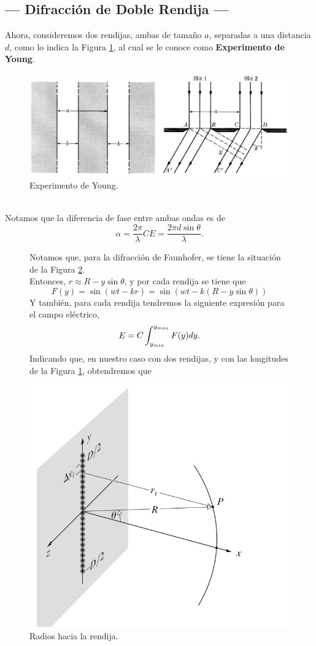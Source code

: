 \documentclass[12pt,a4paper]{article}
\begin{document}
\subsection{--- Difracción de Doble Rendija ---} %
\label{sub:difraccion_dos}
Ahora, consideremos dos rendijas, ambas de tamaño \(a\), separadas a una distancia \(d\), como lo indica la Figura \ref{fig:exp_young}, al cual se le conoce como \textbf{Experimento de Young}.
\begin{figure}[hbt!]
	\centering
	\includegraphics[width= 0.8 \linewidth]{1_INTRO/dos_rendijas.png}
	\caption{Experimento de Young.}
	\label{fig:exp_young}
\end{figure}\\
Notamos que la diferencia de fase entre ambas ondas es de
\[
	\alpha = \dfrac{2 \pi}{\lambda} CE = \dfrac{2 \pi d \sin \theta}{\lambda}.
\]
\begin{figure}[hbtp!]
	\begin{minipage}{0.5\linewidth}
	Notamos que, para la difracción de Faunhofer, se tiene la situación de la Figura \ref{fig:radios}. \\[2mm]
	Entonces, \(r \approx R - y \sin \theta\), y por cada rendija se tiene que 
		\[
			F(y) = \sin (wt- kr) = \sin (wt-k(R - y \sin \theta))
		\]
		Y también, para cada rendija tendremos la siguiente expresión para el campo eléctrico,
		\[
			E = C \displaystyle\int _{y_{min}} ^{y_{max}} F(y) dy.
		\]
		Indicando que, en nuestro caso con dos rendijas, y con las longitudes de la Figura \ref{fig:exp_young}, obtendremos que
	\end{minipage}\hspace{5mm}
	\begin{minipage}{0.5\linewidth}
	\centering
	\includegraphics[width= 0.8 \linewidth]{1_INTRO/fran}
	\caption{Radios hacia la rendija.}
	\label{fig:radios}
	\end{minipage}
\end{figure}
\end{document}
